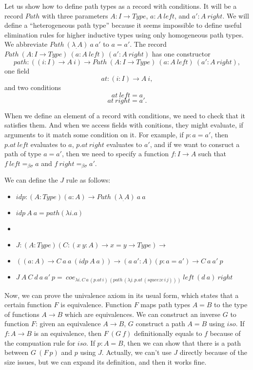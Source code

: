 \documentclass{amsart}
\theoremstyle{definition}
\theoremstyle{remark}
\newcommand{\bs}{\beta\sigma}
\newcommand{\ebs}{=_{\bs}}
\numberwithin{figure}{section}
\begin{document}
Let us show how to define path types as a record with conditions.
It will be a record $Path$ with three parameters $A : I \to Type$, $a : A\ left$, and $a' : A\ right$.
We will define a ``heterogeneous path type'' because it seems impossible to define useful elimination rules for higher inductive types using only homogeneous path types.
We abbreviate $Path\ (\lambda _. A)\ a\ a'$ to $a = a'$.
The record $Path\ (A : I \to Type)\ (a : A\ left)\ (a' : A\ right)$ has one constructor
\[ path : ((i : I) \to A\ i) \to Path\ (A : I \to Type)\ (a : A\ left)\ (a' : A\ right), \]
one field
\[ at : (i : I) \to A\ i, \]
and two conditions
\[ at\ left = a \]
\[ at\ right = a'. \]

When we define an element of a record with conditions, we need to check that it satisfies them.
And when we access fields with conitions, they might evaluate, if arguments to it match some condition on it.
For example, if $p : a = a'$, then $p.at\ left$ evaluates to $a$, $p.at\ right$ evaluates to $a'$,
and if we want to consruct a path of type $a = a'$, then we need to specify a function $f : I \to A$ such that $f\ left \ebs a$ and $f\ right \ebs a'$.

We can define the $J$ rule as follows:
\begin{itemize}
\item[] $idp : (A : Type) (a : A) \to Path\ (\lambda _. A)\ a\ a$
\item[] $idp\ A\ a = path (\lambda i. a)$
\item[]
\item[] $J : (A : Type) (C : (x\ y : A) \to x = y \to Type) \to$
\item[] \qquad $((a : A) \to C\ a\ a\ (idp\ A\ a)) \to (a\ a' : A) (p : a = a') \to C\ a\ a'\ p$
\item[] $J\ A\ C\ d\ a\ a'\ p =\ coe_{\lambda i.\,C\,a\,(p.at\,i)\,(path\,(\lambda j.\,p.at\,(squeeze\,i\,j)))}\ left\ (d\ a)\ right$
\end{itemize}

Now, we can prove the univalence axiom in its usual form, which states that a certain function $F$ is equivalence.
Function $F$ maps path types $A = B$ to the type of functions $A \to B$ which are equivalences.
We can construct an inverse $G$ to function $F$: given an equivalence $A \to B$, $G$ construct a path $A = B$ using $iso$.
If $f : A \to B$ is an equivalence, then $F\ (G\ f)$ definitionally equals to $f$ because of the compuation rule for $iso$.
If $p : A = B$, then we can show that there is a path between $G\ (F\ p)$ and $p$ using $J$.
Actually, we can't use $J$ directly because of the size issues, but we can expand its definition, and then it works fine.
\end{document}

